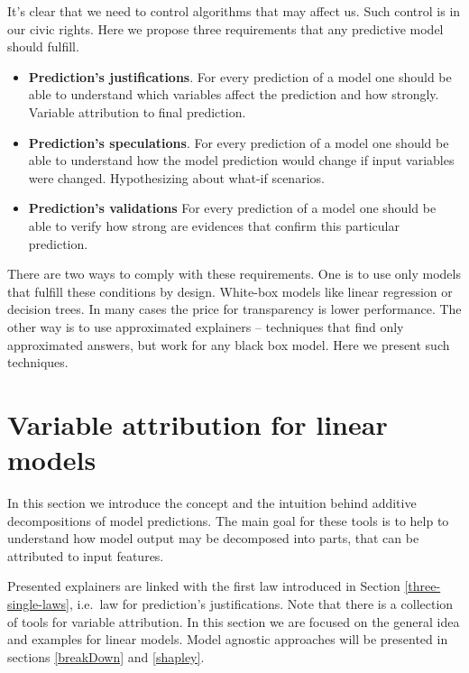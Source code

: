 \documentclass[]{krantz}
\providecommand{\tightlist}{%
  \setlength{\itemsep}{0pt}\setlength{\parskip}{0pt}}
\theoremstyle{definition}
\theoremstyle{definition}
\theoremstyle{definition}
\theoremstyle{remark}
\begin{document}
It's clear that we need to control algorithms that may affect us. Such
control is in our civic rights. Here we propose three requirements that
any predictive model should fulfill.

\begin{itemize}
\tightlist
\item
  \textbf{Prediction's justifications}. For every prediction of a model
  one should be able to understand which variables affect the prediction
  and how strongly. Variable attribution to final prediction.
\item
  \textbf{Prediction's speculations}. For every prediction of a model
  one should be able to understand how the model prediction would change
  if input variables were changed. Hypothesizing about what-if
  scenarios.
\item
  \textbf{Prediction's validations} For every prediction of a model one
  should be able to verify how strong are evidences that confirm this
  particular prediction.
\end{itemize}

There are two ways to comply with these requirements. One is to use only
models that fulfill these conditions by design. White-box models like
linear regression or decision trees. In many cases the price for
transparency is lower performance. The other way is to use approximated
explainers -- techniques that find only approximated answers, but work
for any black box model. Here we present such techniques.

\hypertarget{variableAttributionMethods}{%
\section{Variable attribution for linear
models}\label{variableAttributionMethods}}

In this section we introduce the concept and the intuition behind
additive decompositions of model predictions. The main goal for these
tools is to help to understand how model output may be decomposed into
parts, that can be attributed to input features.

Presented explainers are linked with the first law introduced in Section
\ref{three-single-laws}, i.e.~law for prediction's justifications. Note
that there is a collection of tools for variable attribution. In this
section we are focused on the general idea and examples for linear
models. Model agnostic approaches will be presented in sections
\ref{breakDown} and \ref{shapley}.
\end{document}
